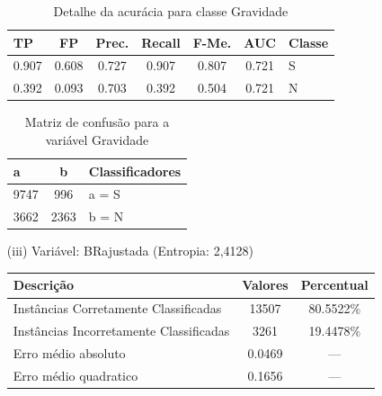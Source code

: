 \begin{enumerate}
\pagebreak	
	
	\begin{table}[!ht]
		\centering
		\caption{Detalhe da acurácia para classe Gravidade}
		\vspace{1mm}
		\begin{tabular}{l|c|c|c|c|c|l}
			\hline
			\textbf{TP} & \textbf{FP} & \textbf{Prec.} & \textbf{Recall} & \textbf{F-Me.} & \textbf{AUC} & \textbf{Classe} \\
			\hline
			0.907 & 0.608 & 0.727 & 0.907 & 0.807 & 0.721 & S \\
			0.392 & 0.093 & 0.703 & 0.392 & 0.504 & 0.721 & N \\
				
		\end{tabular}
	\end{table}
	
	\begin{table}[!ht]
		\centering
		\caption{Matriz de confusão para a variável Gravidade}
		\vspace{1mm}
		\begin{tabular}{l|c|l}
			\hline
			\textbf{a} & \textbf{b} & \textbf{Classificadores}\\
			\hline
			9747 & 996 & a = S \\
			3662 & 2363 & b = N \\
		\end{tabular}
	\end{table}
	
	
	\item[(iii)] Variável: BRajustada (Entropia: 2,4128)
	\begin{table}[!ht]
		\centering
		\vspace{1mm}
		\begin{tabular}{l|c|c}
			\hline
			\textbf{Descrição} & \textbf{Valores} & \textbf{Percentual} \\
			\hline
			Instâncias Corretamente Classificadas & 13507 & 80.5522\% \\
			Instâncias Incorretamente Classificadas & 3261 & 19.4478\% \\
			Erro médio absoluto & 0.0469 & ---  \\
			Erro médio quadratico & 0.1656 & --- \\
		\end{tabular}
	\end{table}
	

\end{enumerate}
